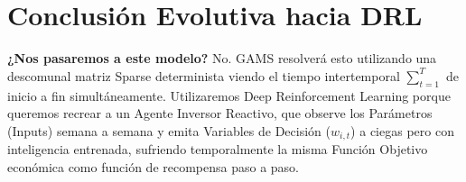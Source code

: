 \documentclass[11pt,a4paper]{article}
\begin{document}
\section{Conclusión Evolutiva hacia DRL}
\textbf{¿Nos pasaremos a este modelo?}
No. GAMS resolverá esto utilizando una descomunal matriz Sparse determinista viendo el tiempo intertemporal $\sum_{t=1}^T$ de inicio a fin simultáneamente.
Utilizaremos Deep Reinforcement Learning porque queremos recrear a un Agente Inversor Reactivo, que observe los Parámetros (Inputs) semana a semana y emita Variables de Decisión ($w_{i,t}$) a ciegas pero con inteligencia entrenada, sufriendo temporalmente la misma Función Objetivo económica como función de recompensa paso a paso.
\end{document}
